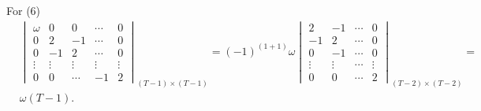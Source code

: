 \documentclass[12pt,a4paper,hyperref]{article}
\begin{document}
For (6)
\begin{align*}
& \begin{vmatrix}
\omega & 0    & 0       &     \cdots    &0 \\
   0  & 2      & -1      &     \cdots    &0 \\
    0   & -1     & 2       &    \cdots     & 0 \\
 \vdots & \vdots & \vdots  & \vdots  & \vdots\\
    0   &  0     &  \cdots & -1      & 2
\end{vmatrix}
_{(T-1) \times (T-1)} =
(-1)^{(1+1)}\omega
\begin{vmatrix}
 2     & -1     & \cdots & 0 \\
 -1    & 2      & \cdots &   0 \\
  0    & -1     & \cdots & 0 \\
\vdots & \vdots & \cdots & \vdots \\
   0   & 0      & \cdots & 2
\end{vmatrix}
_{(T-2) \times (T-2)}= \\
& \omega (T-1).
\end{align*}
\end{document}

